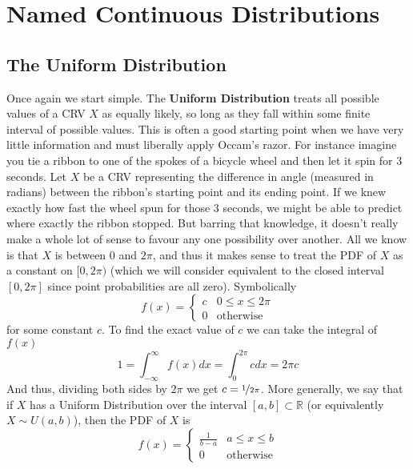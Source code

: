 \documentclass{report}
\begin{document}
\section{Named Continuous Distributions}
\subsection{The Uniform Distribution}
Once again we start simple. The \textbf{Uniform Distribution} treats all possible values of a CRV $X$ as equally likely, so long as they fall within some finite interval of possible values. This is often a good starting point when we have very little information and must liberally apply Occam's razor. For instance imagine you tie a ribbon to one of the spokes of a bicycle wheel and then let it spin for 3 seconds. Let $X$ be a CRV representing the difference in angle (measured in radians) between the ribbon's starting point and its ending point. If we knew exactly how fast the wheel spun for those 3 seconds, we might be able to predict where exactly the ribbon stopped. But barring that knowledge, it doesn't really make a whole lot of sense to favour any one possibility over another. All we know is that $X$ is between 0 and $2\pi$, and thus it makes sense to treat the PDF of $X$ as a constant on $[0,2\pi)$ (which we will consider equivalent to the closed interval $[0,2\pi]$ since point probabilities are all zero). Symbolically
\[
    f(x)=\begin{cases}
        c & 0\le x \le 2\pi
        \\
        0 & \text{otherwise}
    \end{cases}
\]
for some constant $c$. To find the exact value of $c$ we can take the integral of $f(x)$
\[
    1=\int_{-\infty}^\infty f(x)dx=\int_0^{2\pi} c dx=2\pi c
\]
And thus, dividing both sides by $2\pi$ we get $c=\nicefrac 1 {2\pi}$. More generally, we say that if $X$ has a Uniform Distribution over the interval $[a,b]\subset\mathbb R$ (or equivalently $X\sim U(a,b)$), then the PDF of $X$ is
\[
    f(x)=\begin{cases}
        \frac 1 {b-a} & a\le x \le b
        \\
        0 & \text{otherwise}
    \end{cases}
\]
\end{document}
